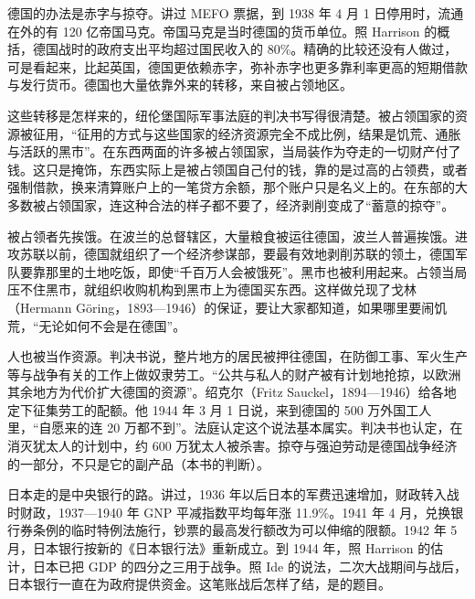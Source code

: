 德国的办法是赤字与掠夺。讲过 MEFO 票据，到 1938 年 4 月 1 日停用时，流通在外的有 120 亿帝国马克\cite{nca1946b}。帝国马克是当时德国的货币单位。照 Harrison 的概括，德国战时的政府支出平均超过国民收入的 80\%\cite{harrison1992}。精确的比较还没有人做过，可是看起来，比起英国，德国更依赖赤字，弥补赤字也更多靠利率更高的短期借款与发行货币\cite{harrison1992}。德国也大量依靠外来的转移，来自被占领地区\cite{harrison1992}。

这些转移是怎样来的，纽伦堡国际军事法庭的判决书写得很清楚。被占领国家的资源被征用，“征用的方式与这些国家的经济资源完全不成比例，结果是饥荒、通胀与活跃的黑市”\cite{nca1947}。在东西两面的许多被占领国家，当局装作为夺走的一切财产付了钱\cite{nca1947}。这只是掩饰，东西实际上是被占领国自己付的钱，靠的是过高的占领费，或者强制借款，换来清算账户上的一笔贷方余额，那个账户只是名义上的\cite{nca1947}。在东部的大多数被占领国家，连这种合法的样子都不要了，经济剥削变成了“蓄意的掠夺”\cite{nca1947}。

被占领者先挨饿。在波兰的总督辖区，大量粮食被运往德国，波兰人普遍挨饿\cite{nca1947}。进攻苏联以前，德国就组织了一个经济参谋部，要最有效地剥削苏联的领土，德国军队要靠那里的土地吃饭，即使“千百万人会被饿死”\cite{nca1947}。黑市也被利用起来。占领当局压不住黑市，就组织收购机构到黑市上为德国买东西\cite{nca1947}。这样做兑现了戈林（Hermann Göring，1893—1946）的保证，要让大家都知道，如果哪里要闹饥荒，“无论如何不会是在德国”\cite{nca1947,loc30}。

人也被当作资源。判决书说，整片地方的居民被押往德国，在防御工事、军火生产等与战争有关的工作上做奴隶劳工\cite{nca1947}。“公共与私人的财产被有计划地抢掠，以欧洲其余地方为代价扩大德国的资源”\cite{nca1947}。绍克尔（Fritz Sauckel，1894—1946）给各地定下征集劳工的配额\cite{nca1947,loc30}。他 1944 年 3 月 1 日说，来到德国的 500 万外国工人里，“自愿来的连 20 万都不到”\cite{nca1947}。法庭认定这个说法基本属实\cite{nca1947}。判决书也认定，在消灭犹太人的计划中，约 600 万犹太人被杀害\cite{nca1947}。掠夺与强迫劳动是德国战争经济的一部分，不只是它的副产品（本书的判断）。

日本走的是中央银行的路。讲过，1936 年以后日本的军费迅速增加，财政转入战时财政，1937—1940 年 GNP 平减指数平均每年涨 11.9\%\cite{ide2003,shizume2009}。1941 年 4 月，兑换银行券条例的临时特例法施行，钞票的最高发行额改为可以伸缩的限额\cite{bojchron}。1942 年 5 月，日本银行按新的《日本银行法》重新成立\cite{bojchron}。到 1944 年，照 Harrison 的估计，日本已把 GDP 的四分之三用于战争\cite{harrison1998a}。照 Ide 的说法，二次大战期间与战后，日本银行一直在为政府提供资金\cite{ide2003}。这笔账战后怎样了结，是的题目。

